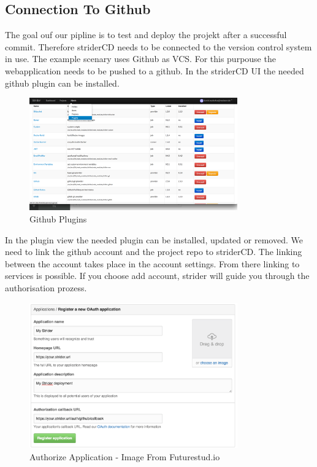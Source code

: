 \newpage

\subsection{Connection To Github}
\label{subsection:Connection To Github}
The goal ouf our pipline is to test and deploy the projekt after a successful commit. Therefore striderCD needs to be connected to the version
control system in use. The example scenary uses Github as VCS. For this purpouse the webapplication needs to be pushed to a github. In the striderCD
UI the needed github plugin can be installed.

\begin{figure}[h!]
  \centering
      \includegraphics[width=0.8\textwidth]{images/plugin_page.png}
  \caption{Github Plugins}
\end{figure}

In the plugin view the needed plugin can be installed, updated or removed. We need to link the github account and the project repo to striderCD.
The linking between the account takes place in the account settings. From there linking to services is possible. If you choose add account, strider
will guide you through the authorisation prozess.

\begin{figure}[h!]
  \centering
  \includegraphics[width=0.8\textwidth]{images/auth_app.png}
  \caption{Authorize Application - Image From Futurestud.io}
\end{figure}

